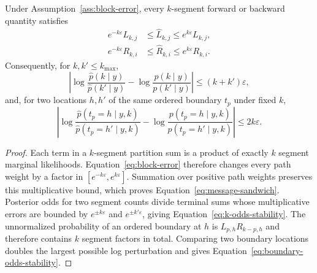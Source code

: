 \begin{theorem}
\label{thm:stability-paper}
Under Assumption~\ref{ass:block-error}, every $k$-segment forward or backward quantity satisfies
\begin{align}
e^{-k\varepsilon}L_{k,j}
&\le\widehat L_{k,j}\le e^{k\varepsilon}L_{k,j},\nonumber\\
e^{-k\varepsilon}R_{k,i}
&\le\widehat R_{k,i}\le e^{k\varepsilon}R_{k,i}.
\label{eq:message-sandwich}
\end{align}
Consequently, for $k,k'\le k_{\max}$,
\begin{equation}
\left|
\log\frac{\widehat p(k\mid y)}{\widehat p(k'\mid y)}
-\log\frac{p(k\mid y)}{p(k'\mid y)}
\right|\le(k+k')\varepsilon,
\label{eq:k-odds-stability}
\end{equation}
and, for two locations $h,h'$ of the same ordered boundary $t_p$ under fixed $k$,
\begin{equation}
\left|
\log\frac{\widehat p(t_p=h\mid y,k)}{\widehat p(t_p=h'\mid y,k)}
-\log\frac{p(t_p=h\mid y,k)}{p(t_p=h'\mid y,k)}
\right|\le2k\varepsilon.
\label{eq:boundary-odds-stability}
\end{equation}
\end{theorem}
\begin{proof}
Each term in a $k$-segment partition sum is a product of exactly $k$ segment marginal likelihoods. Equation~\eqref{eq:block-error} therefore changes every path weight by a factor in $[e^{-k\varepsilon},e^{k\varepsilon}]$. Summation over positive path weights preserves this multiplicative bound, which proves Equation~\eqref{eq:message-sandwich}. Posterior odds for two segment counts divide terminal sums whose multiplicative errors are bounded by $e^{\pm k\varepsilon}$ and $e^{\pm k'\varepsilon}$, giving Equation~\eqref{eq:k-odds-stability}. The unnormalized probability of an ordered boundary at $h$ is $L_{p,h}R_{k-p,h}$ and therefore contains $k$ segment factors in total. Comparing two boundary locations doubles the largest possible log perturbation and gives Equation~\eqref{eq:boundary-odds-stability}.
\end{proof}

